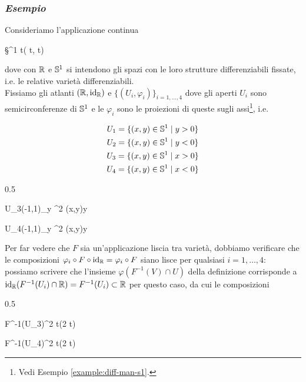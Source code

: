 \subsubsection{\textit{Esempio}}

Consideriamo l'applicazione continua

	{\R}{\S^{1}}
	{t}{( \pi t,  \pi t)}

dove con $ \R $ e $ \S^{1} $ si intendono gli spazi con le loro strutture differenziabili fissate, i.e. le relative varietà differenziabili. \\
Fissiamo gli atlanti $ (\R,\id_{\R}) $ e $ \{(U_{i},\varphi_{i})\}_{i=1,\dots,4} $ dove gli aperti $ U_{i} $ sono semicirconferenze di $ \S^{1} $ e le $ \varphi_{i} $ sono le proiezioni di queste sugli assi\footnote{%
	Vedi Esempio \ref{example:diff-man-s1}.%
}, i.e.

\begin{gather}
	U_{1} = \{ (x,y) \in \S^{1} \mid y>0 \} \\
	U_{2} = \{ (x,y) \in \S^{1} \mid y<0 \} \\
	U_{3} = \{ (x,y) \in \S^{1} \mid x>0 \} \\
	U_{4} = \{ (x,y) \in \S^{1} \mid x<0 \}
\end{gather}

	{0.5}{%
				{U_{3}}{(-1,1)_{y} \subset \R^{2}}
				{(x,y)}{y}
			
				{U_{4}}{(-1,1)_{y} \subset \R^{2}}
				{(x,y)}{y}
			}

Per far vedere che $ F $ sia un'applicazione liscia tra varietà, dobbiamo verificare che le composizioni $ \varphi_{i} \circ F \circ \id_{\R} = \varphi_{i} \circ F $ siano lisce per qualsiasi $ i=1,\dots,4 $: possiamo scrivere che l'insieme $ \varphi(F^{-1}(V) \cap U) $ della definizione corrisponde a $ \id_{\R}(F^{-1}(U_{i}) \cap \R) = F^{-1}(U_{i}) \subset \R $ per questo caso, da cui le composizioni

	{0.5}{%
				{F^{-1}(U_{3})}{\R^{2}}
				{t}{\sin(2 \pi t)}
			
				{F^{-1}(U_{4})}{\R^{2}}
				{t}{\sin(2 \pi t)}
			}


